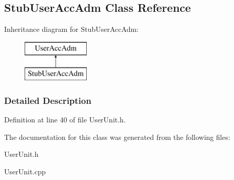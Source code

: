 \hypertarget{classStubUserAccAdm}{\subsection{Stub\-User\-Acc\-Adm Class Reference}
\label{d3/d88/classStubUserAccAdm}
}
Inheritance diagram for Stub\-User\-Acc\-Adm\-:\begin{figure}[H]
\begin{center}
\leavevmode
\includegraphics[height=2.000000cm]{d3/d88/classStubUserAccAdm}
\end{center}
\end{figure}


\subsubsection{Detailed Description}


Definition at line 40 of file User\-Unit.\-h.



The documentation for this class was generated from the following files\-:\begin{DoxyCompactItemize}
\item 
User\-Unit.\-h\item 
User\-Unit.\-cpp\end{DoxyCompactItemize}
